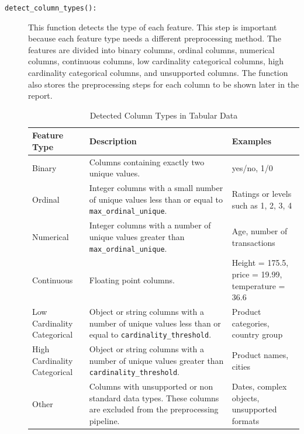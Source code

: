 \documentclass[12pt,a4paper]{report}
\begin{document}
\begin{description}
    \item[\texttt{detect\_column\_types():}]
    This function detects the type of each feature. This step is important because each
    feature type needs a different preprocessing method. The features are divided into
    binary columns, ordinal columns, numerical columns, continuous columns,
    low cardinality categorical columns, high cardinality categorical columns, and
    unsupported columns. The function also stores the preprocessing steps for each
    column to be shown later in the report.
    \begin{table}[!htbp]
    \centering
    \caption{Detected Column Types in Tabular Data}
    \label{tab:feature_types}
    \begin{tabular}{|p{3.5cm}|p{7cm}|p{4cm}|}
    \hline
    \textbf{Feature Type} & \textbf{Description} & \textbf{Examples} \\
    \hline

    Binary &
    Columns containing exactly two unique values. &
    yes/no, 1/0 \\
    \hline

    Ordinal &
    Integer columns with a small number of unique values less than or equal to
    \texttt{max\_ordinal\_unique}. &
    Ratings or levels such as 1, 2, 3, 4 \\
    \hline

    Numerical &
    Integer columns with a number of unique values greater than
    \texttt{max\_ordinal\_unique}. &
    Age, number of transactions \\
    \hline

    Continuous &
    Floating point columns. &
    Height = 175.5, price = 19.99, temperature = 36.6 \\
    \hline

    Low Cardinality Categorical &
    Object or string columns with a number of unique values less than or equal to
    \texttt{cardinality\_threshold}. &
    Product categories, country group \\
    \hline

    High Cardinality Categorical &
    Object or string columns with a number of unique values greater than
    \texttt{cardinality\_threshold}. &
    Product names, cities \\
    \hline

    Other &
    Columns with unsupported or non standard data types. These columns are excluded from
    the preprocessing pipeline. &
    Dates, complex objects, unsupported formats \\
    \hline


\end{tabular}
\end{table}
\end{description}
\end{document}
